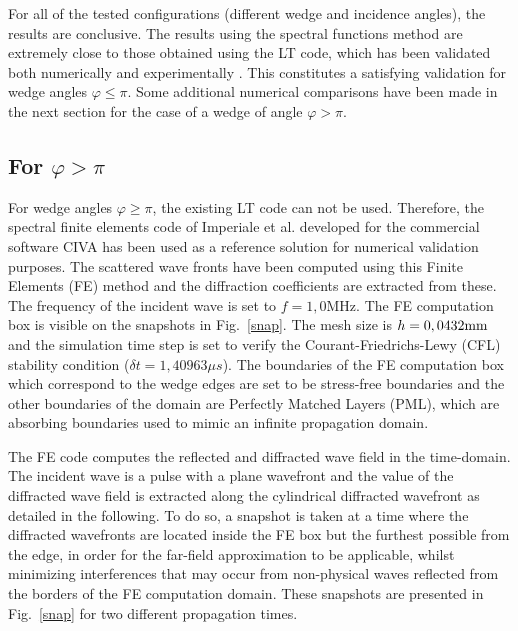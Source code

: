 For all of the tested configurations (different wedge and incidence angles), the results are conclusive. The results using the spectral functions method are extremely close to those obtained using the LT code, which has been validated both numerically and experimentally \cite{GautesenFradkin, ChapmanBurch}. This constitutes a satisfying validation for wedge angles $\varphi \leq \pi$. Some additional numerical comparisons have been made in the next section for the case of a wedge of angle $\varphi>\pi$.

\subsection{For $\varphi>\pi$}
For wedge angles $\varphi \geq \pi$, the existing LT code can not be used. Therefore, the spectral finite elements code of Imperiale et al. developed for the commercial software CIVA \cite{imperiale_ut_2016, imperiale_ut_2017} has been used as a reference solution for numerical validation purposes. The scattered wave fronts have been computed using this Finite Elements (FE) method and the diffraction coefficients are extracted from these. The frequency of the incident wave is set to $f=1,0$MHz. The FE computation box is visible on the snapshots in Fig.~\ref{snap}. The mesh size is $h=0,0432 \rm mm$ and the simulation time step is set to verify the Courant-Friedrichs-Lewy (CFL) stability condition ($\delta t=1,40963 \mu s$). The boundaries of the FE computation box which correspond to the wedge edges are set to be stress-free boundaries and the other boundaries of the domain are Perfectly Matched Layers (PML), which are absorbing boundaries used to mimic an infinite propagation domain.

The FE code computes the reflected and diffracted wave field in the time-domain. The incident wave is a pulse with a plane wavefront and the value of the diffracted wave field is extracted along the cylindrical diffracted wavefront as detailed in the following. To do so, a snapshot is taken at a time where the diffracted wavefronts are located inside the FE box but the furthest possible from the edge, in order for the far-field approximation to be applicable, whilst minimizing interferences that may occur from non-physical waves reflected from the borders of the FE computation domain. These snapshots are presented in Fig.~\ref{snap} for two different propagation times. 

